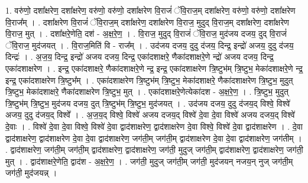\documentclass[17pt]{extarticle}
\begin{document}
1. वरु॑णो॒ दशा᳚क्षरेण॒ दशा᳚क्षरेण॒ वरु॑णो॒ वरु॑णो॒ दशा᳚क्षरेण वि॒राजं॑ ॅवि॒राज॒म् दशा᳚क्षरेण॒ वरु॑णो॒ वरु॑णो॒ दशा᳚क्षरेण वि॒राज᳚म् । . दशा᳚क्षरेण वि॒राजं॑ ॅवि॒राज॒म् दशा᳚क्षरेण॒ दशा᳚क्षरेण वि॒राज॒ मुदुद् वि॒राज॒म् दशा᳚क्षरेण॒ दशा᳚क्षरेण वि॒राज॒ मुत् । . दशा᳚क्षरे॒णेति॒ दश॑ - अ॒क्ष॒रे॒ण॒ । . वि॒राज॒ मुदुद् वि॒राजं॑ ॅवि॒राज॒ मुद॑जय दजय॒ दुद् वि॒राजं॑ ॅवि॒राज॒ मुद॑जयत् । . वि॒राज॒मिति॑ वि - राज᳚म् । . उद॑जय दजय॒ दुदु द॑जय॒ दिन्द्र॒ इन्द्रो॑ अजय॒ दुदु द॑जय॒ दिन्द्रः॑ । . अ॒ज॒य॒ दिन्द्र॒ इन्द्रो॑ अजय दजय॒ दिन्द्र॒ एका॑दशाक्षरे॒ णैका॑दशाक्षरे॒णे न्द्रो॑ अजय दजय॒ दिन्द्र॒ एका॑दशाक्षरेण । . इन्द्र॒ एका॑दशाक्षरे॒ णैका॑दशाक्षरे॒णे न्द्र॒ इन्द्र॒ एका॑दशाक्षरेण त्रि॒ष्टुभ॑म् त्रि॒ष्टुभ॒ मेका॑दशाक्षरे॒णे न्द्र॒ इन्द्र॒ एका॑दशाक्षरेण त्रि॒ष्टुभ᳚म् । . एका॑दशाक्षरेण त्रि॒ष्टुभ॑म् त्रि॒ष्टुभ॒ मेका॑दशाक्षरे॒ णैका॑दशाक्षरेण त्रि॒ष्टुभ॒ मुदुत् त्रि॒ष्टुभ॒ मेका॑दशाक्षरे॒ णैका॑दशाक्षरेण त्रि॒ष्टुभ॒ मुत् । . एका॑दशाक्षरे॒णेत्येका॑दश - अ॒क्ष॒रे॒ण॒ । . त्रि॒ष्टुभ॒ मुदुत् त्रि॒ष्टुभ॑म् त्रि॒ष्टुभ॒ मुद॑जय दजय॒ दुत् त्रि॒ष्टुभ॑म् त्रि॒ष्टुभ॒ मुद॑जयत् । . उद॑जय दजय॒ दुदु द॑जय॒द् विश्वे॒ विश्वे॑ अजय॒ दुदु द॑जय॒द् विश्वे᳚ । . अ॒ज॒य॒द् विश्वे॒ विश्वे॑ अजय दजय॒द् विश्वे॑ दे॒वा दे॒वा विश्वे॑ अजय दजय॒द् विश्वे॑ दे॒वाः । . विश्वे॑ दे॒वा दे॒वा विश्वे॒ विश्वे॑ दे॒वा द्वाद॑शाक्षरेण॒ द्वाद॑शाक्षरेण दे॒वा विश्वे॒ विश्वे॑ दे॒वा द्वाद॑शाक्षरेण । . दे॒वा द्वाद॑शाक्षरेण॒ द्वाद॑शाक्षरेण दे॒वा दे॒वा द्वाद॑शाक्षरेण॒ जग॑ती॒म् जग॑ती॒म् द्वाद॑शाक्षरेण दे॒वा दे॒वा द्वाद॑शाक्षरेण॒ जग॑तीम् । . द्वाद॑शाक्षरेण॒ जग॑ती॒म् जग॑ती॒म् द्वाद॑शाक्षरेण॒ द्वाद॑शाक्षरेण॒ जग॑ती॒ मुदुज् जग॑ती॒म् द्वाद॑शाक्षरेण॒ द्वाद॑शाक्षरेण॒ जग॑ती॒ मुत् । . द्वाद॑शाक्षरे॒णेति॒ द्वाद॑श - अ॒क्ष॒रे॒ण॒ । . जग॑ती॒ मुदुज् जग॑ती॒म् जग॑ती॒ मुद॑जयन् नजय॒न् नुज् जग॑ती॒म् जग॑ती॒ मुद॑जयन्न् । \newline
\end{document}
